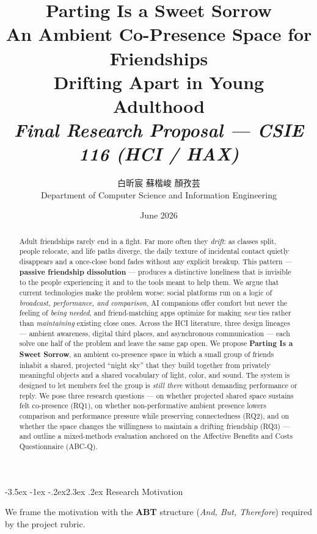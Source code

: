 \documentclass[11pt]{article}
\title{\vspace{-1.2cm}\textbf{\color{accent}Parting Is a Sweet Sorrow}\\[0.35em]
{\large\color{rust} An Ambient Co-Presence Space for Friendships\\ Drifting Apart in Young Adulthood}\\[0.6em]
{\normalsize\itshape Final Research Proposal — CSIE 116 (HCI / HAX)}}
\author{白昕宸 \quad 蘇楷峻 \quad 顏孜芸\\[0.2em]
{\small Department of Computer Science and Information Engineering}}
\date{June 2026}
\makeatletter
\renewcommand\section{\@startsection{section}{1}{\z@}%
  {-3.5ex \@plus -1ex \@minus -.2ex}{2.3ex \@plus .2ex}%
  {\normalfont\Large\bfseries\color{accent}}}
\makeatother
\begin{document}
\maketitle

\begin{abstract}
\noindent
Adult friendships rarely end in a fight. Far more often they \emph{drift}: as
classes split, people relocate, and life paths diverge, the daily texture of
incidental contact quietly disappears and a once-close bond fades without any
explicit breakup. This pattern --- \textbf{passive friendship dissolution} ---
produces a distinctive loneliness that is invisible to the people experiencing
it and to the tools meant to help them. We argue that current technologies make
the problem worse: social platforms run on a logic of \emph{broadcast,
performance, and comparison}, AI companions offer comfort but never the feeling
of \emph{being needed}, and friend-matching apps optimize for making
\emph{new} ties rather than \emph{maintaining} existing close ones. Across the
HCI literature, three design lineages --- ambient awareness, digital third
places, and asynchronous communication --- each solve one half of the problem
and leave the same gap open. We propose \textbf{Parting Is a Sweet Sorrow}, an
ambient co-presence space in which a small group of friends inhabit a shared,
projected ``night sky'' that they build together from privately meaningful
objects and a shared vocabulary of light, color, and sound. The system is
designed to let members feel the group is \emph{still there} without demanding
performance or reply. We pose three research questions --- on whether projected
shared space sustains felt co-presence (RQ1), on whether non-performative
ambient presence lowers comparison and performance pressure while preserving
connectedness (RQ2), and on whether the space changes the willingness to
maintain a drifting friendship (RQ3) --- and outline a mixed-methods evaluation
anchored on the Affective Benefits and Costs Questionnaire (ABC-Q).
\end{abstract}

\section{Research Motivation}

We frame the motivation with the \textbf{ABT} structure (\emph{And, But,
Therefore}) required by the project rubric.
\end{document}

